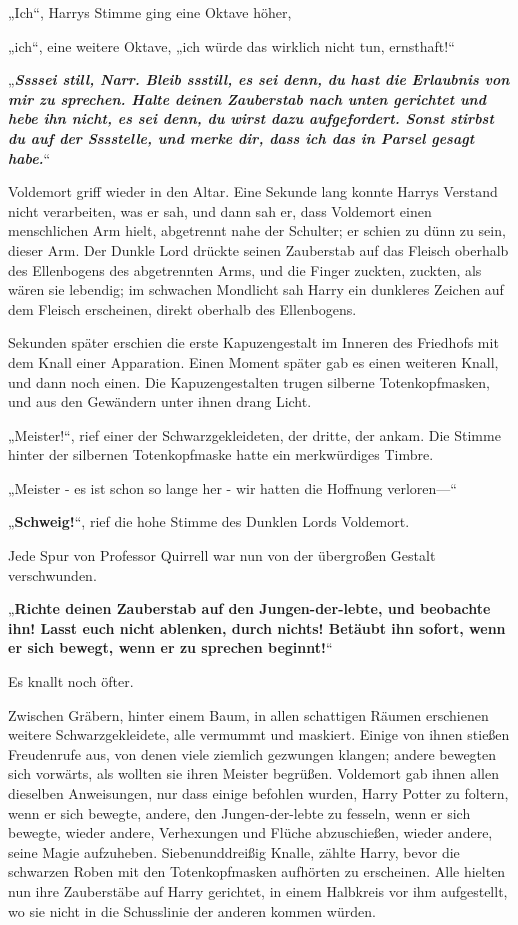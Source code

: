 {„Ich“, Harrys Stimme ging eine Oktave höher,

„ich“, eine weitere Oktave, „ich würde das wirklich nicht tun, ernsthaft!“

„\textbf{\emph{Ssssei still, Narr. Bleib ssstill, es sei denn, du hast die Erlaubnis von mir zu sprechen. Halte deinen Zauberstab nach unten gerichtet und hebe ihn nicht, es sei denn, du wirst dazu aufgefordert. Sonst stirbst du auf der Sssstelle, und merke dir, dass ich das in Parsel gesagt habe.}}“

Voldemort griff wieder in den Altar. Eine Sekunde lang konnte Harrys Verstand nicht verarbeiten, was er sah, und dann sah er, dass Voldemort einen menschlichen Arm hielt, abgetrennt nahe der Schulter; er schien zu dünn zu sein, dieser Arm. Der Dunkle Lord drückte seinen Zauberstab auf das Fleisch oberhalb des Ellenbogens des abgetrennten Arms, und die Finger zuckten, zuckten, als wären sie lebendig; im schwachen Mondlicht sah Harry ein dunkleres Zeichen auf dem Fleisch erscheinen, direkt oberhalb des Ellenbogens.

Sekunden später erschien die erste Kapuzengestalt im Inneren des Friedhofs mit dem Knall einer Apparation. Einen Moment später gab es einen weiteren Knall, und dann noch einen. Die Kapuzengestalten trugen silberne Totenkopfmasken, und aus den Gewändern unter ihnen drang Licht.

„Meister!“, rief einer der Schwarzgekleideten, der dritte, der ankam. Die Stimme hinter der silbernen Totenkopfmaske hatte ein merkwürdiges Timbre.

„Meister - es ist schon so lange her - wir hatten die Hoffnung verloren—“

„\textbf{Schweig!}“, rief die hohe Stimme des Dunklen Lords Voldemort.

Jede Spur von Professor Quirrell war nun von der übergroßen Gestalt verschwunden.

„\textbf{Richte deinen Zauberstab auf den Jungen-der-lebte, und beobachte ihn! Lasst euch nicht ablenken, durch nichts! Betäubt ihn sofort, wenn er sich bewegt, wenn er zu sprechen beginnt!}“

Es knallt noch öfter.

Zwischen Gräbern, hinter einem Baum, in allen schattigen Räumen erschienen weitere Schwarzgekleidete, alle vermummt und maskiert. Einige von ihnen stießen Freudenrufe aus, von denen viele ziemlich gezwungen klangen; andere bewegten sich vorwärts, als wollten sie ihren Meister begrüßen. Voldemort gab ihnen allen dieselben Anweisungen, nur dass einige befohlen wurden, Harry Potter zu foltern, wenn er sich bewegte, andere, den Jungen-der-lebte zu fesseln, wenn er sich bewegte, wieder andere, Verhexungen und Flüche abzuschießen, wieder andere, seine Magie aufzuheben. Siebenunddreißig Knalle, zählte Harry, bevor die schwarzen Roben mit den Totenkopfmasken aufhörten zu erscheinen. Alle hielten nun ihre Zauberstäbe auf Harry gerichtet, in einem Halbkreis vor ihm aufgestellt, wo sie nicht in die Schusslinie der anderen kommen würden.

}
